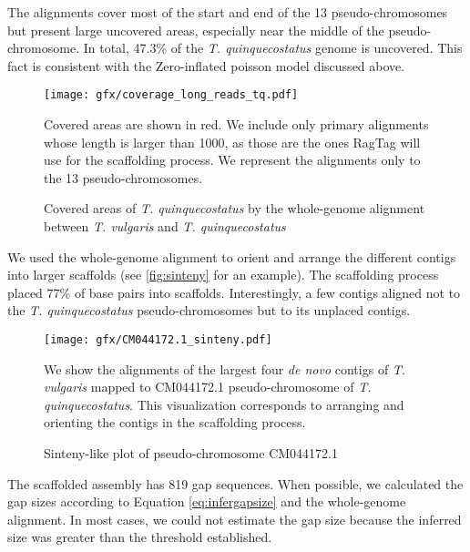 The alignments cover most of the start and end of the 13 pseudo-chromosomes but present large uncovered areas, especially near the middle of the pseudo-chromosome. In total, 47.3\% of the \textit{T. quinquecostatus} genome is uncovered. This fact is consistent with the Zero-inflated poisson model discussed above.\\

\begin{figure}[h]
    \begin{center}
        \texttt{[image: gfx/coverage\_long\_reads\_tq.pdf]}
        \caption{Covered areas of \textit{T. quinquecostatus} by the whole-genome alignment between \textit{T. vulgaris} and \textit{T. quinquecostatus}}   
        \label{fig:coverage_long_reads}
 
    \end{center}
        \footnotesize
    Covered areas are shown in red. We include only primary alignments whose length is larger than 1000, as those are the ones RagTag will use for the scaffolding process. We represent the alignments only to the 13 pseudo-chromosomes.  
\end{figure}   

We used the whole-genome alignment to orient and arrange the different contigs into larger scaffolds (see \autoref{fig:sinteny} for an example). The scaffolding process placed 77\% of base pairs into scaffolds. Interestingly, a few contigs aligned not to the \textit{T. quinquecostatus} pseudo-chromosomes but to its unplaced contigs.\\
 

\begin{figure}
\begin{center}
    \texttt{[image: gfx/CM044172.1\_sinteny.pdf]}
    \caption{Sinteny-like plot of pseudo-chromosome CM044172.1}  
    \label{fig:sinteny}    
\end{center}
\footnotesize
We show the alignments of the largest four \textit{de novo} contigs of \textit{T. vulgaris} mapped to  CM044172.1 pseudo-chromosome of \textit{T. quinquecostatus}. This visualization corresponds to arranging and orienting the contigs in the scaffolding process. 
\end{figure} 

The scaffolded assembly has 819 gap sequences. When possible, we calculated the gap sizes according to Equation \eqref{eq:infergapsize} and the whole-genome alignment. In most cases, we could not estimate the gap size because the inferred size was greater than the threshold established.\\

